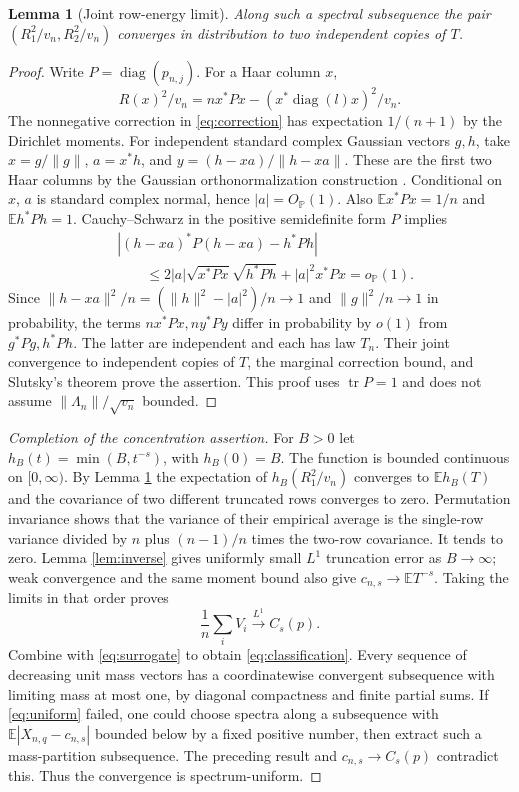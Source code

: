 \documentclass[11pt]{article}
\newtheorem{lemma}[theorem]{Lemma}
\newcommand{\E}{\mathbb E}
\newcommand{\Pp}{\mathbb P}
\newcommand{\diag}{\operatorname{diag}}
\begin{document}
\begin{lemma}[Joint row-energy limit]\label{lem:pair}
Along such a spectral subsequence the pair $(R_1^2/v_n,R_2^2/v_n)$ converges in distribution to two independent copies of $T$.
\end{lemma}
\begin{proof}
Write $P=\diag(p_{n,j})$. For a Haar column $x$,
\begin{equation}
 R(x)^2/v_n=n x^*Px-(x^*\diag(l)x)^2/v_n.
\label{eq:correction}
\end{equation}
The nonnegative correction in \eqref{eq:correction} has expectation $1/(n+1)$ by the Dirichlet moments. For independent standard complex Gaussian vectors $g,h$, take $x=g/\|g\|$, $a=x^*h$, and $y=(h-xa)/\|h-xa\|$. These are the first two Haar columns by the Gaussian orthonormalization construction \cite{Meckes}. Conditional on $x$, $a$ is standard complex normal, hence $|a|=O_{\Pp}(1)$. Also $\E x^*Px=1/n$ and $\E h^*Ph=1$. Cauchy--Schwarz in the positive semidefinite form $P$ implies
\begin{align*}
&|(h-xa)^*P(h-xa)-h^*Ph|\\
&\qquad\le2|a|\sqrt{x^*Px}\sqrt{h^*Ph}+|a|^2 x^*Px=o_{\Pp}(1).
\end{align*}
Since $\|h-xa\|^2/n=(\|h\|^2-|a|^2)/n\to1$ and $\|g\|^2/n\to1$ in probability, the terms $nx^*Px,ny^*Py$ differ in probability by $o(1)$ from $g^*Pg,h^*Ph$. The latter are independent and each has law $T_n$. Their joint convergence to independent copies of $T$, the marginal correction bound, and Slutsky's theorem prove the assertion. This proof uses $\operatorname{tr}P=1$ and does not assume $\|\Lambda_n\|/\sqrt{v_n}$ bounded.
\end{proof}

\begin{proof}[Completion of the concentration assertion]
For $B>0$ let $h_B(t)=\min(B,t^{-s})$, with $h_B(0)=B$. The function is bounded continuous on $[0,\infty)$. By Lemma \ref{lem:pair} the expectation of $h_B(R_1^2/v_n)$ converges to $\E h_B(T)$ and the covariance of two different truncated rows converges to zero. Permutation invariance shows that the variance of their empirical average is the single-row variance divided by $n$ plus $(n-1)/n$ times the two-row covariance. It tends to zero. Lemma \ref{lem:inverse} gives uniformly small $L^1$ truncation error as $B\to\infty$; weak convergence and the same moment bound also give $c_{n,s}\to\E T^{-s}$. Taking the limits in that order proves
\[
\frac1n\sum_i V_i\xrightarrow{L^1} C_s(p).
\]
Combine with \eqref{eq:surrogate} to obtain \eqref{eq:classification}. Every sequence of decreasing unit mass vectors has a coordinatewise convergent subsequence with limiting mass at most one, by diagonal compactness and finite partial sums. If \eqref{eq:uniform} failed, one could choose spectra along a subsequence with $\E|X_{n,q}-c_{n,s}|$ bounded below by a fixed positive number, then extract such a mass-partition subsequence. The preceding result and $c_{n,s}\to C_s(p)$ contradict this. Thus the convergence is spectrum-uniform.
\end{proof}
\end{document}
